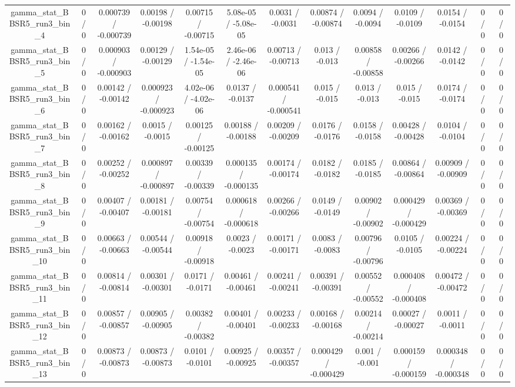 \documentclass[10pt]{article}
\begin{document}
\begin{table}[htbp]
\begin{center}
\begin{tabular}{|c|c|c|c|c|c|c|c|c|c|c|c|c|}
  gamma_stat_BBSR5_run3_bin_4 & 0 / 0 & 0.000739 / -0.000739 & 0.00198 / -0.00198 & 0.00715 / -0.00715 & 5.08e-05 / -5.08e-05 & 0.0031 / -0.0031 & 0.00874 / -0.00874 & 0.0094 / -0.0094 & 0.0109 / -0.0109 & 0.0154 / -0.0154 & 0 / 0 & 0 / 0 \\ 
  gamma_stat_BBSR5_run3_bin_5 & 0 / 0 & 0.000903 / -0.000903 & 0.00129 / -0.00129 & 1.54e-05 / -1.54e-05 & 2.46e-06 / -2.46e-06 & 0.00713 / -0.00713 & 0.013 / -0.013 & 0.00858 / -0.00858 & 0.00266 / -0.00266 & 0.0142 / -0.0142 & 0 / 0 & 0 / 0 \\ 
  gamma_stat_BBSR5_run3_bin_6 & 0 / 0 & 0.00142 / -0.00142 & 0.000923 / -0.000923 & 4.02e-06 / -4.02e-06 & 0.0137 / -0.0137 & 0.000541 / -0.000541 & 0.015 / -0.015 & 0.013 / -0.013 & 0.015 / -0.015 & 0.0174 / -0.0174 & 0 / 0 & 0 / 0 \\ 
  gamma_stat_BBSR5_run3_bin_7 & 0 / 0 & 0.00162 / -0.00162 & 0.0015 / -0.0015 & 0.00125 / -0.00125 & 0.00188 / -0.00188 & 0.00209 / -0.00209 & 0.0176 / -0.0176 & 0.0158 / -0.0158 & 0.00428 / -0.00428 & 0.0104 / -0.0104 & 0 / 0 & 0 / 0 \\ 
  gamma_stat_BBSR5_run3_bin_8 & 0 / 0 & 0.00252 / -0.00252 & 0.000897 / -0.000897 & 0.00339 / -0.00339 & 0.000135 / -0.000135 & 0.00174 / -0.00174 & 0.0182 / -0.0182 & 0.0185 / -0.0185 & 0.00864 / -0.00864 & 0.00909 / -0.00909 & 0 / 0 & 0 / 0 \\ 
  gamma_stat_BBSR5_run3_bin_9 & 0 / 0 & 0.00407 / -0.00407 & 0.00181 / -0.00181 & 0.00754 / -0.00754 & 0.000618 / -0.000618 & 0.00266 / -0.00266 & 0.0149 / -0.0149 & 0.00902 / -0.00902 & 0.000429 / -0.000429 & 0.00369 / -0.00369 & 0 / 0 & 0 / 0 \\ 
  gamma_stat_BBSR5_run3_bin_10 & 0 / 0 & 0.00663 / -0.00663 & 0.00544 / -0.00544 & 0.00918 / -0.00918 & 0.0023 / -0.0023 & 0.00171 / -0.00171 & 0.0083 / -0.0083 & 0.00796 / -0.00796 & 0.0105 / -0.0105 & 0.00224 / -0.00224 & 0 / 0 & 0 / 0 \\ 
  gamma_stat_BBSR5_run3_bin_11 & 0 / 0 & 0.00814 / -0.00814 & 0.00301 / -0.00301 & 0.0171 / -0.0171 & 0.00461 / -0.00461 & 0.00241 / -0.00241 & 0.00391 / -0.00391 & 0.00552 / -0.00552 & 0.000408 / -0.000408 & 0.00472 / -0.00472 & 0 / 0 & 0 / 0 \\ 
  gamma_stat_BBSR5_run3_bin_12 & 0 / 0 & 0.00857 / -0.00857 & 0.00905 / -0.00905 & 0.00382 / -0.00382 & 0.00401 / -0.00401 & 0.00233 / -0.00233 & 0.00168 / -0.00168 & 0.00214 / -0.00214 & 0.00027 / -0.00027 & 0.0011 / -0.0011 & 0 / 0 & 0 / 0 \\ 
  gamma_stat_BBSR5_run3_bin_13 & 0 / 0 & 0.00873 / -0.00873 & 0.00873 / -0.00873 & 0.0101 / -0.0101 & 0.00925 / -0.00925 & 0.00357 / -0.00357 & 0.000429 / -0.000429 & 0.001 / -0.001 & 0.000159 / -0.000159 & 0.000348 / -0.000348 & 0 / 0 & 0 / 0 \\ 

\end{tabular}
\end{center}
\end{table}
\end{document}

